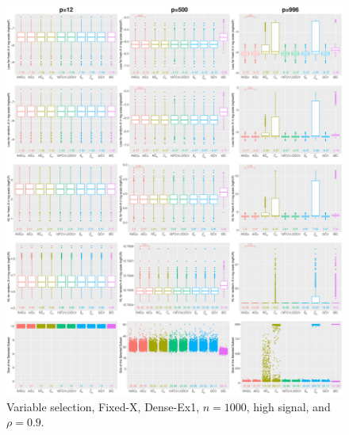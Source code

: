\begin{figure}[!ht]
\centering
\includegraphics[width=\textwidth]{figures/supplement/fixedx/subset_selection/Dense-Ex1_n1000_hsnr_rho09.eps}
\caption{Variable selection, Fixed-X, Dense-Ex1, $n=1000$, high signal, and $\rho=0.9$.}
\end{figure}
\clearpage
